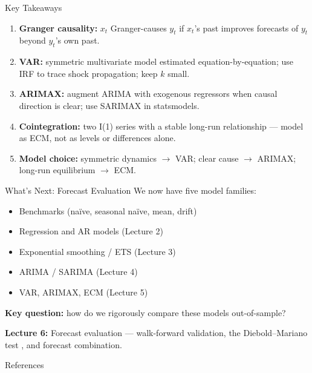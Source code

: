 \documentclass[aspectratio=169, 11pt]{beamer}
\begin{document}
\begin{frame}{Key Takeaways}
  \begin{keybox}
    {\small
    \setlength{\itemsep}{1pt}
    \begin{enumerate}
      \item \textbf{Granger causality:} $x_t$ Granger-causes $y_t$ if
            $x_t$'s past improves forecasts of $y_t$ beyond $y_t$'s own past.
      \item \textbf{VAR:} symmetric multivariate model estimated
            equation-by-equation; use IRF to trace shock propagation;
            keep $k$ small.
      \item \textbf{ARIMAX:} augment ARIMA with exogenous regressors when
            causal direction is clear; use SARIMAX in statsmodels.
      \item \textbf{Cointegration:} two I(1) series with a stable long-run
            relationship --- model as ECM, not as levels or differences alone.
      \item \textbf{Model choice:} symmetric dynamics $\to$ VAR; clear cause
            $\to$ ARIMAX; long-run equilibrium $\to$ ECM.
    \end{enumerate}
    }
  \end{keybox}
\end{frame}

\begin{frame}{What's Next: Forecast Evaluation}
  We now have five model families:
  \begin{itemize}\small
    \item Benchmarks (na\"{i}ve, seasonal na\"{i}ve, mean, drift)
    \item Regression and AR models (Lecture 2)
    \item Exponential smoothing / ETS (Lecture 3)
    \item ARIMA / SARIMA (Lecture 4)
    \item VAR, ARIMAX, ECM (Lecture 5)
  \end{itemize}
  \vspace{0.1cm}
  \textbf{Key question:} how do we rigorously compare these models
  out-of-sample?
  \begin{keybox}
    \textbf{Lecture 6:} Forecast evaluation --- walk-forward validation,
    the Diebold--Mariano test \parencite{Diebold1995}, and forecast
    combination.
  \end{keybox}
  \begin{center}
  \end{center}
\end{frame}

\begin{frame}[allowframebreaks]{References}
  \printbibliography[heading=none]
\end{frame}
\end{document}
